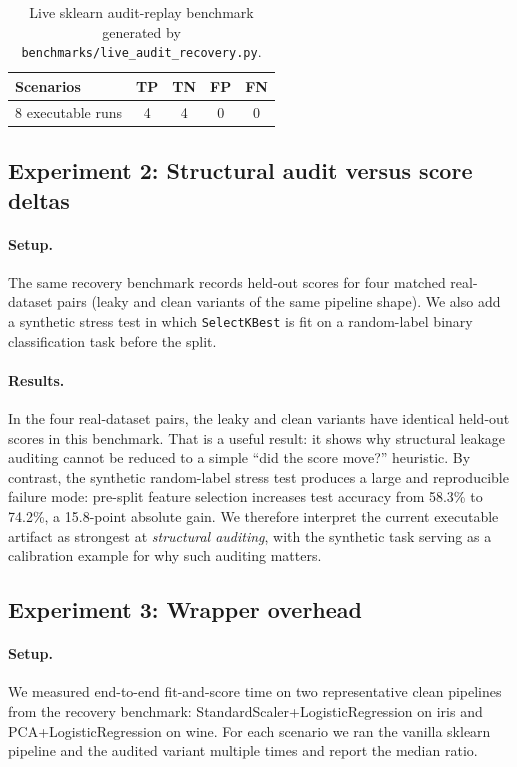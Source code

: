 \documentclass[11pt]{article}
\begin{document}
\begin{table}[t]
\centering
\caption{Live sklearn audit-replay benchmark generated by
  \texttt{benchmarks/live\_audit\_recovery.py}.}
\label{tab:live-recovery}
\begin{tabular}{@{}lcccc@{}}
\toprule
\textbf{Scenarios} & \textbf{TP} & \textbf{TN} & \textbf{FP} & \textbf{FN} \\
\midrule
8 executable runs & 4 & 4 & 0 & 0 \\
\bottomrule
\end{tabular}
\end{table}

\subsection{Experiment 2: Structural audit versus score deltas}

\paragraph{Setup.}
The same recovery benchmark records held-out scores for four matched
real-dataset pairs (leaky and clean variants of the same pipeline
shape).  We also add a synthetic stress test in which
\texttt{SelectKBest} is fit on a random-label binary classification
task before the split.

\paragraph{Results.}
In the four real-dataset pairs, the leaky and clean variants have
identical held-out scores in this benchmark.  That is a useful result:
it shows why structural leakage auditing cannot be reduced to a simple
``did the score move?'' heuristic.  By contrast, the synthetic
random-label stress test produces a large and reproducible failure
mode: pre-split feature selection increases test accuracy from 58.3\%
to 74.2\%, a 15.8-point absolute gain.  We therefore interpret the
current executable artifact as strongest at \emph{structural auditing},
with the synthetic task serving as a calibration example for why such
auditing matters.

\subsection{Experiment 3: Wrapper overhead}

\paragraph{Setup.}
We measured end-to-end fit-and-score time on two representative clean
pipelines from the recovery benchmark: StandardScaler+LogisticRegression
on iris and PCA+LogisticRegression on wine.  For each scenario we ran
the vanilla sklearn pipeline and the audited variant multiple times and
report the median ratio.
\end{document}
